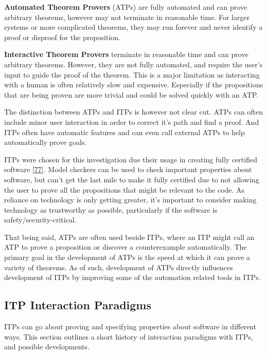 \documentclass[
]{article}
\begin{document}
\textbf{Automated Theorem Provers} (ATPs) are fully automated and can
prove arbitrary theorems, however may not terminate in reasonable time.
For larger systems or more complicated theorems, they may run forever
and never identify a proof or disproof for the proposition.

\textbf{Interactive Theorem Provers} terminate in reasonable time and
can prove arbitrary theorems. However, they are not fully automated, and
require the user's input to guide the proof of the theorem. This is a
major limitation as interacting with a human is often relatively slow
and expensive. Especially if the propositions that are being proven are
more trivial and could be solved quickly with an ATP.

The distinction between ATPs and ITPs is however not clear cut. ATPs can
often include minor user interaction in order to correct it's path and
find a proof. And ITPs often have automatic features and can even call
external ATPs to help automatically prove goals.

ITPs were chosen for this investigation due their usage in creating
fully certified software
{[}\protect\hyperlink{ref-CertifiedSoftware}{77}{]}. Model checkers can
be used to check important properties about software, but can't get the
last mile to make it fully certified due to not allowing the user to
prove all the propositions that might be relevant to the code. As
reliance on technology is only getting greater, it's important to
consider making technology as trustworthy as possible, particularly if
the software is safety/security-critical.

That being said, ATPs are often used beside ITPs, where an ITP might
call an ATP to prove a proposition or discover a counterexample
automatically. The primary goal in the development of ATPs is the speed
at which it can prove a variety of theorems. As of such, development of
ATPs directly influences development of ITPs by improving some of the
automation related tools in ITPs.

\hypertarget{sec:interaction_paradigms}{%
\subsection{ITP Interaction Paradigms}\label{sec:interaction_paradigms}}

ITPs can go about proving and specifying properties about software in
different ways. This section outlines a short history of interaction
paradigms with ITPs, and possible developments.
\end{document}
